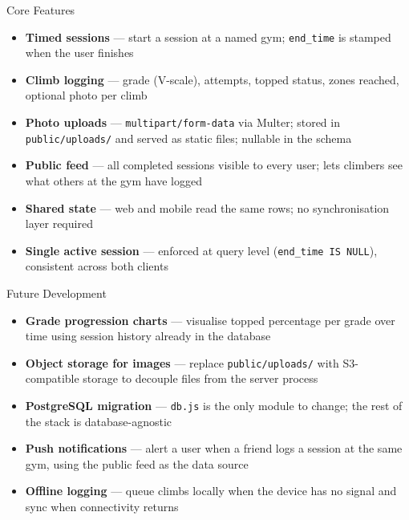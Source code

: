 \documentclass[final]{beamer}
\newlength{\colwidth}
\begin{document}
\begin{frame}[t,fragile]
\begin{columns}[t]
\begin{column}{\colwidth}
  \begin{block}{Core Features}
    \begin{itemize}\setlength\itemsep{2pt}
      \item \textbf{Timed sessions} --- start a session at a named gym;
            \texttt{end\_time} is stamped when the user finishes
      \item \textbf{Climb logging} --- grade (V-scale), attempts, topped
            status, zones reached, optional photo per climb
      \item \textbf{Photo uploads} --- \texttt{multipart/form-data} via
            Multer; stored in \texttt{public/uploads/} and served as
            static files; nullable in the schema
      \item \textbf{Public feed} --- all completed sessions visible to
            every user; lets climbers see what others at the gym have logged
      \item \textbf{Shared state} --- web and mobile read the same rows;
            no synchronisation layer required
      \item \textbf{Single active session} --- enforced at query level
            (\texttt{end\_time IS NULL}), consistent across both clients
    \end{itemize}
  \end{block}

  \begin{block}{Future Development}
    \begin{itemize}\setlength\itemsep{2pt}
      \item \textbf{Grade progression charts} --- visualise topped percentage
            per grade over time using session history already in the database
      \item \textbf{Object storage for images} --- replace \texttt{public/uploads/}
            with S3-compatible storage to decouple files from the server process
      \item \textbf{PostgreSQL migration} --- \texttt{db.js} is the only module
            to change; the rest of the stack is database-agnostic
      \item \textbf{Push notifications} --- alert a user when a friend logs a
            session at the same gym, using the public feed as the data source
      \item \textbf{Offline logging} --- queue climbs locally when the device
            has no signal and sync when connectivity returns
    \end{itemize}
  \end{block}


\end{column}
\end{columns}
\end{frame}
\end{document}
